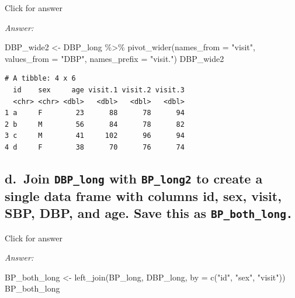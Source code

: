 \documentclass[
]{book}
\newenvironment{Shaded}{\begin{snugshade}}{\end{snugshade}}
\newcommand{\AttributeTok}[1]{\textcolor[rgb]{0.77,0.63,0.00}{#1}}
\newcommand{\FunctionTok}[1]{\textcolor[rgb]{0.00,0.00,0.00}{#1}}
\newcommand{\NormalTok}[1]{#1}
\newcommand{\OtherTok}[1]{\textcolor[rgb]{0.56,0.35,0.01}{#1}}
\newcommand{\SpecialCharTok}[1]{\textcolor[rgb]{0.00,0.00,0.00}{#1}}
\newcommand{\StringTok}[1]{\textcolor[rgb]{0.31,0.60,0.02}{#1}}
\begin{document}
Click for answer

\emph{Answer:}

\begin{Shaded}
\begin{Highlighting}[]
\NormalTok{DBP\_wide2 }\OtherTok{\textless{}{-}}\NormalTok{ DBP\_long }\SpecialCharTok{\%\textgreater{}\%} 
  \FunctionTok{pivot\_wider}\NormalTok{(}\AttributeTok{names\_from =} \StringTok{"visit"}\NormalTok{,}
              \AttributeTok{values\_from =} \StringTok{"DBP"}\NormalTok{,}
              \AttributeTok{names\_prefix =} \StringTok{"visit."}\NormalTok{)}
\NormalTok{DBP\_wide2}
\end{Highlighting}
\end{Shaded}

\begin{verbatim}
# A tibble: 4 x 6
  id    sex     age visit.1 visit.2 visit.3
  <chr> <chr> <dbl>   <dbl>   <dbl>   <dbl>
1 a     F        23      88      78      94
2 b     M        56      84      78      82
3 c     M        41     102      96      94
4 d     F        38      70      76      74
\end{verbatim}

\hypertarget{d.-join-dbp_long-with-bp_long2-to-create-a-single-data-frame-with-columns-id-sex-visit-sbp-dbp-and-age.-save-this-as-bp_both_long.}{%
\subsection{\texorpdfstring{d.~Join \texttt{DBP\_long} with \texttt{BP\_long2} to create a single data frame with columns id, sex, visit, SBP, DBP, and age. Save this as \texttt{BP\_both\_long.}}{d.~Join DBP\_long with BP\_long2 to create a single data frame with columns id, sex, visit, SBP, DBP, and age. Save this as BP\_both\_long.}}\label{d.-join-dbp_long-with-bp_long2-to-create-a-single-data-frame-with-columns-id-sex-visit-sbp-dbp-and-age.-save-this-as-bp_both_long.}}

Click for answer

\emph{Answer:}

\begin{Shaded}
\begin{Highlighting}[]
\NormalTok{BP\_both\_long }\OtherTok{\textless{}{-}} \FunctionTok{left\_join}\NormalTok{(BP\_long, DBP\_long, }\AttributeTok{by =} \FunctionTok{c}\NormalTok{(}\StringTok{"id"}\NormalTok{, }\StringTok{"sex"}\NormalTok{, }\StringTok{"visit"}\NormalTok{))}
\NormalTok{BP\_both\_long}
\end{Highlighting}
\end{Shaded}
\end{document}
